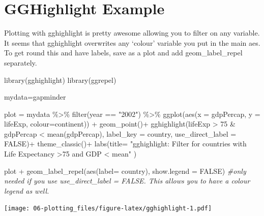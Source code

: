 \documentclass[
]{book}
\newenvironment{Shaded}{\begin{snugshade}}{\end{snugshade}}
\newcommand{\AttributeTok}[1]{\textcolor[rgb]{0.77,0.63,0.00}{#1}}
\newcommand{\CommentTok}[1]{\textcolor[rgb]{0.56,0.35,0.01}{\textit{#1}}}
\newcommand{\ConstantTok}[1]{\textcolor[rgb]{0.00,0.00,0.00}{#1}}
\newcommand{\DecValTok}[1]{\textcolor[rgb]{0.00,0.00,0.81}{#1}}
\newcommand{\FunctionTok}[1]{\textcolor[rgb]{0.00,0.00,0.00}{#1}}
\newcommand{\NormalTok}[1]{#1}
\newcommand{\OtherTok}[1]{\textcolor[rgb]{0.56,0.35,0.01}{#1}}
\newcommand{\SpecialCharTok}[1]{\textcolor[rgb]{0.00,0.00,0.00}{#1}}
\newcommand{\StringTok}[1]{\textcolor[rgb]{0.31,0.60,0.02}{#1}}
\begin{document}
\hypertarget{gghighlight-example}{%
\section{GGHighlight Example}\label{gghighlight-example}}

Plotting with gghighlight is pretty awesome allowing you to filter on any variable. It seems that gghighlight overwrites any `colour' variable you put in the main aes. To get round this and have labels, save as a plot and add geom\_label\_repel separately.

\begin{Shaded}
\begin{Highlighting}[]
\FunctionTok{library}\NormalTok{(gghighlight)}
\FunctionTok{library}\NormalTok{(ggrepel)}

\NormalTok{mydata}\OtherTok{=}\NormalTok{gapminder}

\NormalTok{plot }\OtherTok{=}\NormalTok{ mydata }\SpecialCharTok{\%\textgreater{}\%} 
  \FunctionTok{filter}\NormalTok{(year }\SpecialCharTok{==} \StringTok{"2002"}\NormalTok{) }\SpecialCharTok{\%\textgreater{}\%} 
  \FunctionTok{ggplot}\NormalTok{(}\FunctionTok{aes}\NormalTok{(}\AttributeTok{x =}\NormalTok{ gdpPercap, }\AttributeTok{y =}\NormalTok{ lifeExp, }\AttributeTok{colour=}\NormalTok{continent)) }\SpecialCharTok{+}
  \FunctionTok{geom\_point}\NormalTok{()}\SpecialCharTok{+}
  \FunctionTok{gghighlight}\NormalTok{(lifeExp }\SpecialCharTok{\textgreater{}} \DecValTok{75} \SpecialCharTok{\&}\NormalTok{ gdpPercap }\SpecialCharTok{\textless{}} \FunctionTok{mean}\NormalTok{(gdpPercap), }\AttributeTok{label\_key =}\NormalTok{ country, }\AttributeTok{use\_direct\_label =} \ConstantTok{FALSE}\NormalTok{)}\SpecialCharTok{+} 
  \FunctionTok{theme\_classic}\NormalTok{()}\SpecialCharTok{+} 
  \FunctionTok{labs}\NormalTok{(}\AttributeTok{title=} \StringTok{"gghighlight: Filter for countries with Life Expectancy \textgreater{}75 and GDP \textless{} mean"}\NormalTok{ )  }

\NormalTok{plot }\SpecialCharTok{+} \FunctionTok{geom\_label\_repel}\NormalTok{(}\FunctionTok{aes}\NormalTok{(}\AttributeTok{label=}\NormalTok{ country), }\AttributeTok{show.legend =} \ConstantTok{FALSE}\NormalTok{) }\CommentTok{\#only needed if you use  use\_direct\_label = FALSE. This allows you to have a colour legend as well. }
\end{Highlighting}
\end{Shaded}

\texttt{[image: 06-plotting\_files/figure-latex/gghighlight-1.pdf]}
\end{document}
